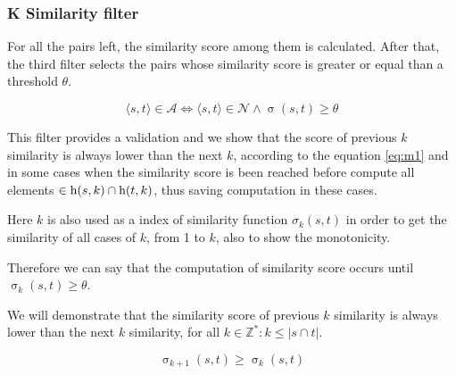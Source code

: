 

\subsubsection{K Similarity filter} \label{mfc:filter}

For all the pairs left, the similarity score among them is calculated. After that, the third filter selects the pairs whose similarity score is greater or equal than a threshold $\theta$. 

\begin{equation}
	\langle s,t \rangle \in \mathcal{A} \Leftrightarrow \langle s,t \rangle \in \mathcal{N} \wedge \upsigma(s,t) \geq \theta
\end{equation}

This filter provides a validation and we show that the score of previous $k$ similarity is always lower than the next $k$, according to the equation \ref{eq:m1} and in some cases when the similarity score is been reached before compute all elements $\in \textnormal{h}(s,k) \cap \textnormal{h}(t,k)$, thus saving computation in these cases. 

Here $k$ is also used as a index of similarity function $\sigma_k(s,t)$ in order to get the similarity of all cases of $k$, from 1 to $k$, also to show the monotonicity.

Therefore we can say that the computation of similarity score occurs until $\upsigma_k(s,t) \geq \theta$.

We will demonstrate that the similarity score of previous $k$ similarity is always lower than the next $k$ similarity, for all $k \in \mathbb{Z}^* : k \leq |s \cap t|$. 

\begin{equation}\label{eq:m1}
	\upsigma_{k+1}(s,t) \geq \upsigma_{k}(s,t)
\end{equation}

